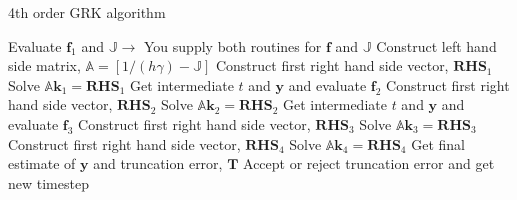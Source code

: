 \documentclass[serif]{beamer}
\begin{document}
\begin{frame}{4th order GRK algorithm}
\small
\begin{algorithmic}[1]
  \State Evaluate $\mathbf{f}_1$ and $\mathbb{J}\rightarrow$ \alert{You supply both routines for $\mathbf{f}$ and $\mathbb{J}$}
    \State Construct left hand side matrix, $\mathbb{A} = \left[1/\left(h\gamma\right) - \mathbb{J}\right]$
    \State Construct first right hand side vector, $\mathbf{RHS}_1$
    \State Solve $\mathbb{A}\mathbf{k}_1=\mathbf{RHS}_1$
    \State Get intermediate $t$ and $\mathbf{y}$ and evaluate $\mathbf{f}_2$
    \State Construct first right hand side vector, $\mathbf{RHS}_2$
    \State Solve $\mathbb{A}\mathbf{k}_2=\mathbf{RHS}_2$
    \State Get intermediate $t$ and $\mathbf{y}$ and evaluate $\mathbf{f}_3$
    \State Construct first right hand side vector, $\mathbf{RHS}_3$
    \State Solve $\mathbb{A}\mathbf{k}_3=\mathbf{RHS}_3$
    \State Construct first right hand side vector, $\mathbf{RHS}_4$
    \State Solve $\mathbb{A}\mathbf{k}_4=\mathbf{RHS}_4$
    \State Get final estimate of $\mathbf{y}$ and truncation error, $\mathbf{T}$
    \State Accept or reject truncation error and get new timestep
  \EndFor
\end{algorithmic}
\end{frame}
\end{document}
